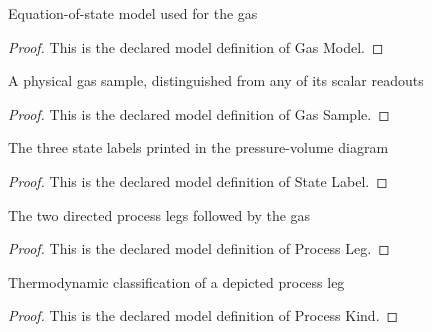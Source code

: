\begin{definition}
  \label{def:physics:phyx-mini-0412:phyxminiproblems-problemphyxmini0412-gasmodel}
  Equation-of-state model used for the gas
\end{definition}
\begin{proof}
  This is the declared model definition of Gas Model.
\end{proof}
\begin{definition}
  \label{def:physics:phyx-mini-0412:phyxminiproblems-problemphyxmini0412-gassample}
  A physical gas sample, distinguished from any of its scalar readouts
\end{definition}
\begin{proof}
  This is the declared model definition of Gas Sample.
\end{proof}
\begin{definition}
  \label{def:physics:phyx-mini-0412:phyxminiproblems-problemphyxmini0412-statelabel}
  The three state labels printed in the pressure-volume diagram
\end{definition}
\begin{proof}
  This is the declared model definition of State Label.
\end{proof}
\begin{definition}
  \label{def:physics:phyx-mini-0412:phyxminiproblems-problemphyxmini0412-processleg}
  The two directed process legs followed by the gas
\end{definition}
\begin{proof}
  This is the declared model definition of Process Leg.
\end{proof}
\begin{definition}
  \label{def:physics:phyx-mini-0412:phyxminiproblems-problemphyxmini0412-processkind}
  Thermodynamic classification of a depicted process leg
\end{definition}
\begin{proof}
  This is the declared model definition of Process Kind.
\end{proof}
